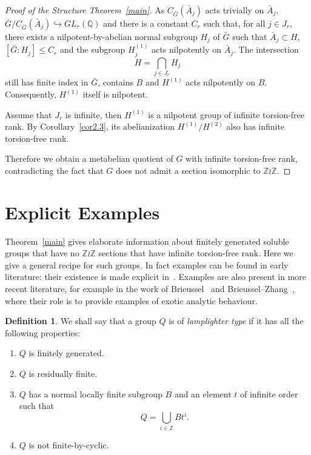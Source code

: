 \documentclass[11pt]{article}
\theoremstyle{definition}
\newtheorem*{defi*}{Definition}
\numberwithin{equation}{section}
\numberwithin{figure}{section}
\numberwithin{table}{section}
\newcommand{\Q}{\mathbb{Q}}
\newcommand{\Z}{\mathbb{Z}}
\newcommand*{\romanenumi}{\renewcommand*{\theenumi}{\roman{enumi}}}
\begin{document}
\begin{proof}[{Proof of the Structure Theorem~\ref{main}}]
As $C_{\bar G}(\bar A_j)$ acts trivially on $\bar A_j$, $\bar G/C_{\bar G}(\bar A_j) \hookrightarrow GL_r(\Q)$ and there is a constant $C_r$ such that, for all $j\in J_r$, there exists a nilpotent-by-abelian normal subgroup $H_j$ of $\bar G$ such that $\bar A_j \subset H$, $[\bar G : H_j] \leq C_r$ and the subgroup $H_j^{(1)}$ acts nilpotently on $\bar A_j$. The intersection
\[
H = \bigcap_{j\in J_r} H_j
\]
still has finite index in $\bar G$, contains $B$ and $H^{(1)}$ acts nilpotently on $B$. Consequently, $H^{(1)}$ itself is nilpotent.


Assume that $J_r$ is infinite, then $H^{(1)}$ is a nilpotent group of infinite torsion-free rank. By Corollary~\ref{cor2.3}, its abelianization $H^{(1)} /H^{(2)}$ also has infinite torsion-free rank.

Therefore we obtain a metabelian quotient of $G$ with infinite torsion-free rank, contradicting the fact that $G$ does not admit a section isomorphic to $\Z\wr\Z$.
\end{proof}


\section{Explicit Examples}\label{sec-4}

Theorem~\ref{main} gives elaborate information about finitely generated soluble groups that have no $\Z\wr\Z$ sections that have infinite torsion-free rank. Here we give a general recipe for such groups. In fact examples can be found in early literature: their existence is made explicit in~\cite{K2}. Examples are also present in more recent literature, for example in the work of Brieussel~\cite{Brieussel} and Brieussel--Zhang~\cite{BZ}, where their role is to provide examples of exotic analytic behaviour.


\begin{defi*} We shall say that a group $Q$ is of \emph{lamplighter type} if it has all the following properties:
\begin{enumerate}\romanenumi
\item \label{list4.def.1}$Q$ is finitely generated.
\item \label{list4.def.2}$Q$ is residually finite.
\item \label{list4.def.3}$Q$ has a normal locally finite subgroup $B$ and an element $t$ of infinite order such that
\[
Q=\bigcup_{i\in\Z}Bt^i.
\]
\item \label{list4.def.4}$Q$ is not finite-by-cyclic.
\end{enumerate}
\end{defi*}
\end{document}
